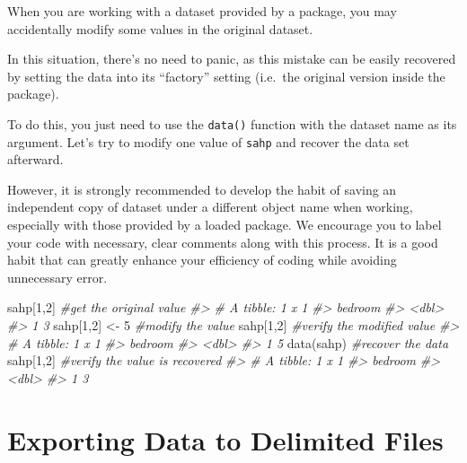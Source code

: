 \documentclass[
]{book}
\newenvironment{Shaded}{\begin{snugshade}}{\end{snugshade}}
\newcommand{\CommentTok}[1]{\textcolor[rgb]{0.56,0.35,0.01}{\textit{#1}}}
\newcommand{\DecValTok}[1]{\textcolor[rgb]{0.00,0.00,0.81}{#1}}
\newcommand{\FunctionTok}[1]{\textcolor[rgb]{0.00,0.00,0.00}{#1}}
\newcommand{\NormalTok}[1]{#1}
\newcommand{\OtherTok}[1]{\textcolor[rgb]{0.56,0.35,0.01}{#1}}
\begin{document}
When you are working with a dataset provided by a package, you may accidentally modify some values in the original dataset.

In this situation, there's no need to panic, as this mistake can be easily recovered by setting the data into its ``factory'' setting (i.e.~the original version inside the package).

To do this, you just need to use the \texttt{data()} function with the dataset name as its argument. Let's try to modify one value of \texttt{sahp} and recover the data set afterward.

However, it is strongly recommended to develop the habit of saving an independent copy of dataset under a different object name when working, especially with those provided by a loaded package. We encourage you to label your code with necessary, clear comments along with this process. It is a good habit that can greatly enhance your efficiency of coding while avoiding unnecessary error.

\begin{Shaded}
\begin{Highlighting}[]
\NormalTok{sahp[}\DecValTok{1}\NormalTok{,}\DecValTok{2}\NormalTok{]              }\CommentTok{\#get the original value}
\CommentTok{\#\textgreater{} \# A tibble: 1 x 1}
\CommentTok{\#\textgreater{}   bedroom}
\CommentTok{\#\textgreater{}     \textless{}dbl\textgreater{}}
\CommentTok{\#\textgreater{} 1       3}
\NormalTok{sahp[}\DecValTok{1}\NormalTok{,}\DecValTok{2}\NormalTok{] }\OtherTok{\textless{}{-}} \DecValTok{5}         \CommentTok{\#modify the value}
\NormalTok{sahp[}\DecValTok{1}\NormalTok{,}\DecValTok{2}\NormalTok{]              }\CommentTok{\#verify the modified value}
\CommentTok{\#\textgreater{} \# A tibble: 1 x 1}
\CommentTok{\#\textgreater{}   bedroom}
\CommentTok{\#\textgreater{}     \textless{}dbl\textgreater{}}
\CommentTok{\#\textgreater{} 1       5}
\FunctionTok{data}\NormalTok{(sahp)             }\CommentTok{\#recover the data}
\NormalTok{sahp[}\DecValTok{1}\NormalTok{,}\DecValTok{2}\NormalTok{]              }\CommentTok{\#verify the value is recovered}
\CommentTok{\#\textgreater{} \# A tibble: 1 x 1}
\CommentTok{\#\textgreater{}   bedroom}
\CommentTok{\#\textgreater{}     \textless{}dbl\textgreater{}}
\CommentTok{\#\textgreater{} 1       3}
\end{Highlighting}
\end{Shaded}

\hypertarget{export-data}{%
\section{Exporting Data to Delimited Files}\label{export-data}}
\end{document}
